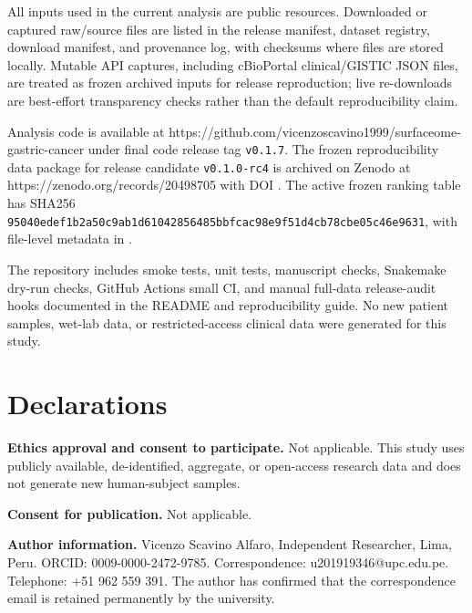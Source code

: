 \documentclass[review,12pt,authoryear]{elsarticle}
\begin{document}
All inputs used in the current analysis are public resources. Downloaded or captured raw/\allowbreak{}source files are listed in the release manifest, dataset registry, download manifest, and provenance log, with checksums where files are stored locally. Mutable API captures, including cBioPortal clinical/\allowbreak{}GISTIC JSON files, are treated as frozen archived inputs for release reproduction;\allowbreak{} live re-downloads are best-effort transparency checks rather than the default reproducibility claim.

Analysis code is available at https:/\allowbreak{}/\allowbreak{}github.com/\allowbreak{}vicenzoscavino1999/\allowbreak{}surfaceome-gastric-cancer under final code release tag \texttt{v0.1.7}. The frozen reproducibility data package for release candidate \texttt{v0.1.0-rc4} is archived on Zenodo at https:/\allowbreak{}/\allowbreak{}zenodo.org/\allowbreak{}records/\allowbreak{}20498705 with DOI . The active frozen ranking table has SHA256 \texttt{9504\allowbreak{}0ede\allowbreak{}f1b2\allowbreak{}a50c\allowbreak{}9ab1\allowbreak{}d610\allowbreak{}4285\allowbreak{}6485\allowbreak{}bbfc\allowbreak{}ac98\allowbreak{}e9f5\allowbreak{}1d4c\allowbreak{}b78c\allowbreak{}be05\allowbreak{}c46e\allowbreak{}9631}, with file-level metadata in .

The repository includes smoke tests, unit tests, manuscript checks, Snakemake dry-run checks, GitHub Actions small CI, and manual full-data release-audit hooks documented in the README and reproducibility guide. No new patient samples, wet-lab data, or restricted-access clinical data were generated for this study.

\FloatBarrier
\section{Declarations}

\textbf{Ethics approval and consent to participate.} Not applicable. This study uses publicly available, de-identified, aggregate, or open-access research data and does not generate new human-subject samples.

\textbf{Consent for publication.} Not applicable.

\textbf{Author information.} Vicenzo Scavino Alfaro, Independent Researcher, Lima, Peru. ORCID: 0009-0000-2472-9785. Correspondence: u201919346@upc.edu.pe. Telephone: +\allowbreak{}51 962 559 391. The author has confirmed that the correspondence email is retained permanently by the university.
\end{document}
